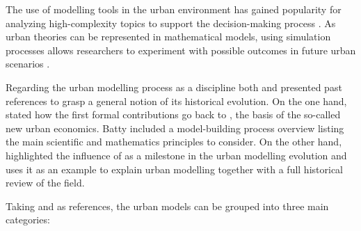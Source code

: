 \documentclass[12pt, a4paper]{report}
\begin{document}
The use of modelling tools in the urban environment has gained popularity for analyzing high-complexity topics to support the decision-making process \citep{houApproachBuildingOccupancy2020}. As urban theories can be represented in mathematical models, using simulation processes allows researchers to experiment with possible outcomes in future urban scenarios \citep{battyUrbanModeling2009a}.

Regarding the urban modelling process as a discipline both \cite{battyUrbanModeling2009a} and \cite{wilsonFutureUrbanModelling2018} presented past references to grasp a general notion of its historical evolution. On the one hand, \cite{battyUrbanModeling2009a} stated how the first formal contributions go back to \cite{alonsoLocationLandUse1964}, the basis of the so-called new urban economics. Batty included a model-building process overview listing the main scientific and mathematics principles to consider. On the other hand, \cite{wilsonScienceCitiesRegions2012} highlighted the influence of \cite{lowryModelMetropolis1964} as a milestone in the urban modelling evolution and uses it as an example to explain urban modelling together with a full historical review of the field.

Taking \cite{battyUrbanModeling2009a} and \cite{wilsonFutureUrbanModelling2018} as references, the urban models can be grouped into three main categories: 
\end{document}

